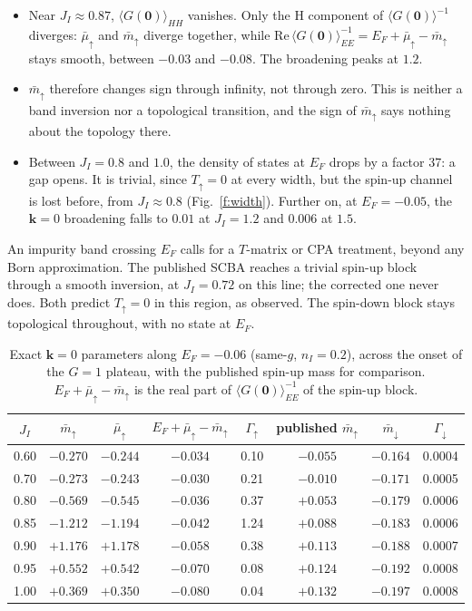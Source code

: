 \documentclass[11pt,a4paper]{article}
\newcommand{\up}{{\uparrow}}
\newcommand{\dn}{{\downarrow}}
\begin{document}
\begin{itemize}
\begin{itemize}
    impurity sites than on the host sites.
  \item Near $J_I\approx0.87$, $\langle G(\bm 0)\rangle_{HH}$ vanishes. Only the H component of
    $\langle G(\bm 0)\rangle^{-1}$ diverges: $\bar\mu_\up$ and $\bar m_\up$ diverge together, while
    $\mathrm{Re}\,\langle G(\bm 0)\rangle^{-1}_{EE}=E_F+\bar\mu_\up-\bar m_\up$ stays smooth, between $-0.03$
    and $-0.08$. The broadening peaks at $1.2$.
  \item $\bar m_\up$ therefore changes sign through infinity, not through zero. This is neither a
    band inversion nor a topological transition, and the sign of $\bar m_\up$ says nothing about
    the topology there.
  \item Between $J_I=0.8$ and $1.0$, the density of states at $E_F$ drops by a factor 37: a gap
    opens. It is trivial, since $T_\up=0$ at every width, but the spin-up channel is lost
    before, from $J_I\approx0.8$ (Fig.~\ref{f:width}). Further on, at $E_F=-0.05$, the $\bm k=0$
    broadening falls to $0.01$ at $J_I=1.2$ and $0.006$ at $1.5$.
  \end{itemize}
  An impurity band crossing $E_F$ calls for a $T$-matrix or CPA treatment, beyond any Born
  approximation. The published SCBA reaches a trivial spin-up block through a smooth inversion,
  at $J_I=0.72$ on this line; the corrected one never does. Both predict $T_\up=0$ in this region,
  as observed. The spin-down block stays topological throughout, with no state at $E_F$.
\end{itemize}

\begin{table}[t]
\centering
\caption{\label{t:resonance}Exact $\bm k=0$ parameters along $E_F=-0.06$ (same-$g$, $n_I=0.2$),
across the onset of the $G=1$ plateau, with the published spin-up mass for comparison.
$E_F+\bar\mu_\up-\bar m_\up$ is the real part of $\langle G(\bm 0)\rangle^{-1}_{EE}$ of the spin-up block.}
\begin{tabular}{cccccccc}
\toprule
$J_I$ & $\bar m_\up$ & $\bar\mu_\up$ & $E_F+\bar\mu_\up-\bar m_\up$ & $\Gamma_\up$ & published $\bar m_\up$ & $\bar m_\dn$ & $\Gamma_\dn$\\
\midrule
0.60 & $-0.270$ & $-0.244$ & $-0.034$ & 0.10 & $-0.055$ & $-0.164$ & 0.0004\\
0.70 & $-0.273$ & $-0.243$ & $-0.030$ & 0.21 & $-0.010$ & $-0.171$ & 0.0005\\
0.80 & $-0.569$ & $-0.545$ & $-0.036$ & 0.37 & $+0.053$ & $-0.179$ & 0.0006\\
0.85 & $-1.212$ & $-1.194$ & $-0.042$ & 1.24 & $+0.088$ & $-0.183$ & 0.0006\\
0.90 & $+1.176$ & $+1.178$ & $-0.058$ & 0.38 & $+0.113$ & $-0.188$ & 0.0007\\
0.95 & $+0.552$ & $+0.542$ & $-0.070$ & 0.08 & $+0.124$ & $-0.192$ & 0.0008\\
1.00 & $+0.369$ & $+0.350$ & $-0.080$ & 0.04 & $+0.132$ & $-0.197$ & 0.0008\\
\bottomrule
\end{tabular}
\end{table}
\end{document}
